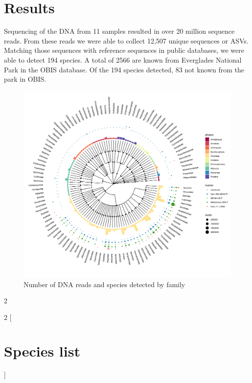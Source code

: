 \documentclass[10pt]{article}
\begin{document}
\section{Results}

Sequencing of the DNA from 11 samples resulted in over 20 million sequence reads. From these reads we were able to collect 12,507 unique sequences or ASVs. Matching those sequences with reference sequences in public databases, we were able to detect 194 species. A total of 2566 are known from Everglades National Park in the OBIS database. Of the 194 species detected, 83 not known from the park in OBIS.






\begin{figure}[h!]
\centering
\includegraphics[width=\textwidth]{tree}
\caption{Number of DNA reads and species detected by family}
\end{figure}

\begin{multicols}{2}
\blindtext
\blindtext
\end{multicols}

\clearpage

\begin{multicols}{2}
[\section{Species list}]
\end{multicols}
\end{document}
